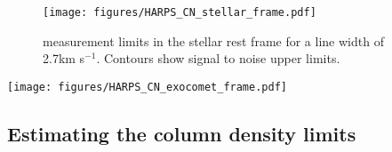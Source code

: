 \documentclass{aa}
\newcommand{\kms}{km s$^{-1}$}
\newcommand{\bp}{$\beta$\,Pic}
\begin{document}
\begin{figure}
    \begin{centering}
        \texttt{[image: figures/HARPS\_CN\_stellar\_frame.pdf]}
        \caption{ measurement limits in the stellar rest frame for a  line width of 2.7\kms{}. Contours show signal to noise upper limits.}
        \label{fig:CN_stellar_frame}
    \end{centering}
\end{figure}



\begin{figure*}
    \begin{centering}
        \texttt{[image: figures/HARPS\_CN\_exocomet\_frame.pdf]}
        \caption{ measurement limits in the exocomet frame for a  line width of 2.7, 10 and 20\kms{}. Contours show signal to noise upper limits.}
        \label{fig:CN_exocomet_frame}
    \end{centering}
\end{figure*}








\subsection{Estimating the  column density limits}\label{sect:CNlim}
\end{document}

